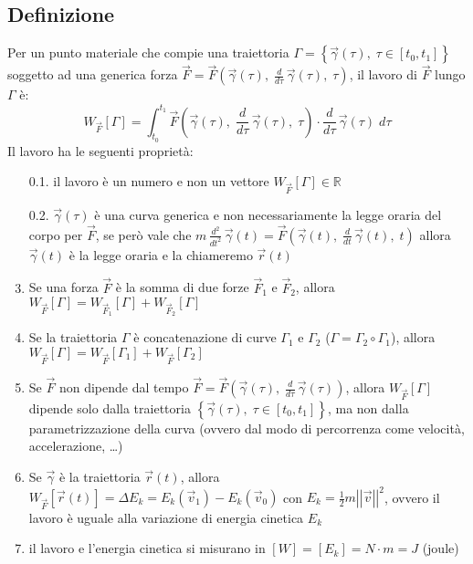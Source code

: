 \documentclass[a4paper]{article}
\newcommand\dt{\frac{d}{dt}\,}
\newcommand\dtau{\frac{d}{d\tau}\,}
\newcommand\dts{\frac{d^2}{dt^2}\,}
\newcommand\vmod[1]{\left|\left|{#1}\right|\right|}
\begin{document}
\subsection{Definizione}
Per un punto materiale che compie una traiettoria \(\Gamma = \left\{ \vec{\gamma}(\tau), \; \tau \in \left[ t_0, t_1 \right] \right\}\)
soggetto ad una generica forza \(\displaystyle \vec{F} = \vec{F}\left( \vec{\gamma}(\tau), \; \dtau \vec{\gamma}(\tau), \; \tau \right)\), il lavoro di \(\vec{F}\)
lungo \(\Gamma\) è:
\[W_{\vec{F}} [\Gamma] = \int_{t_0}^{t_1} \vec{F} \left( \vec{\gamma}(\tau), \; \dtau \vec{\gamma}(\tau), \; \tau \right) \cdot \dtau \vec{\gamma}(\tau) \; d \tau\]
Il lavoro ha le seguenti proprietà:
\begin{enumerate}
	\item[0.1.] il lavoro è un numero e non un vettore \(W_{\vec{F}} [\Gamma] \in \mathbb{R}\)
	\item[0.2.] \(\vec{\gamma}(\tau)\) è una curva generica e non necessariamente la legge oraria del corpo per \(\vec{F}\), se
	però vale che \(\displaystyle m \, \dts \vec{\gamma}(t) = \vec{F}\left( \vec{\gamma}(t), \; \dt \vec{\gamma}(t), \; t \right)\)
	allora \(\vec{\gamma}(t)\) è la legge oraria e la chiameremo \(\vec{r}(t)\)
	\item Se una forza \(\vec{F}\) è la somma di due forze \(\vec{F}_1\) e \(\vec{F}_2\), allora \(W_{\vec{F}}[\Gamma] = W_{\vec{F}_1}[\Gamma] + W_{\vec{F}_2}[\Gamma]\)
	\item Se la traiettoria \(\Gamma\) è concatenazione di curve \(\Gamma_1\) e \(\Gamma_2\) (\(\Gamma = \Gamma_2 \circ \Gamma_1\)),
	allora \(W_{\vec{F}}[\Gamma] = W_{\vec{F}}[\Gamma_1] + W_{\vec{F}}[\Gamma_2]\)
	\item Se \(\vec{F}\) non dipende dal tempo \(\displaystyle \vec{F} = \vec{F}\left( \vec{\gamma}(\tau), \; \dtau \vec{\gamma}(\tau) \right)\),
	allora \(W_{\vec{F}}[\Gamma]\) dipende solo dalla traiettoria \(\left\{ \vec{\gamma}(\tau), \; \tau \in \left[ t_0, t_1 \right] \right\}\), ma
	non dalla parametrizzazione della curva (ovvero dal modo di percorrenza come velocità, accelerazione, \dots)
	\item Se \(\vec{\gamma}\) è la traiettoria \(\vec{r}(t)\), allora \(\displaystyle W_{\vec{F}}[{\vec{r}(t)}] = \Delta E_k = E_k(\vec{v}_1) - E_k(\vec{v}_0)\)
	con \(\displaystyle E_k = \frac{1}{2} m \vmod{\vec{v}}^2\), ovvero il lavoro è uguale alla variazione di energia cinetica \(E_k\)
	\item il lavoro e l'energia cinetica si misurano in \([W] = [E_k] = N \cdot m = J\) (joule)
\end{enumerate}
\end{document}
